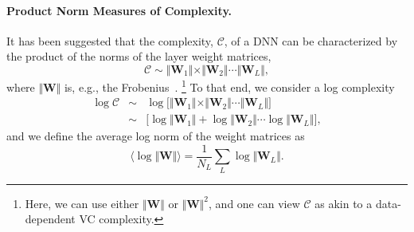 

\paragraph{Product Norm Measures of Complexity.} 

It has been suggested that the complexity, $\mathcal{C}$, of a DNN can be characterized by the product of the norms of the layer weight matrices,
$$
\mathcal{C}\sim\Vert\mathbf{W}_{1}\Vert\times\Vert\mathbf{W}_{2}\Vert\cdots\Vert\mathbf{W}_{L}\Vert ,
$$
where $\Vert\mathbf{W}\Vert$ is, e.g., the Frobenius~\cite{XXX-XXX,XXX-XXX,XXX-XXX}.%
\footnote{Here, we can use either $\Vert\mathbf{W}\Vert$ or $\Vert\mathbf{W}\Vert^{2}$,
and one can view $\mathcal{C}$ as akin to a data-dependent VC complexity.}
%
To that end, we consider a log complexity
\begin{eqnarray*}
\log\mathcal{C} &\sim& \log\bigg[\Vert\mathbf{W}_{1}\Vert\times\Vert\mathbf{W}_{2}\Vert\cdots\Vert\mathbf{W}_{L}\Vert\bigg]  \\
                &\sim& \bigg[\log\Vert\mathbf{W}_{1}\Vert+\log\Vert\mathbf{W}_{2}\Vert\cdots\log\Vert\mathbf{W}_{L}\Vert\bigg]  ,
\end{eqnarray*}
and we define the average log norm of the weight matrices as
\begin{equation}
\langle\log\Vert\mathbf{W}\Vert\rangle=\dfrac{1}{N_{L}}\sum_{L}\log\Vert\mathbf{W}_{L}\Vert  .
\label{eqn:av_log_norm}
\end{equation}


